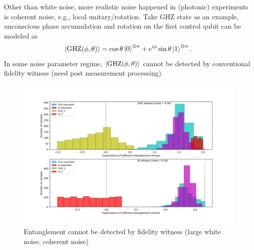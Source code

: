 \documentclass[
reprint,
aps,
pra,
floatfix,
]{revtex4-2}
\theoremstyle{plain}
\theoremstyle{definition}
\newcommand{\ghz}{\text{GHZ}}
\begin{document}
Other than white noise, more realistic noise happened in (photonic) experiments is coherent noise, e.g., local unitary/rotation.
Take GHZ state as an example, unconscious phase accumulation and 
rotation on the first control qubit can be modeled as \cite{zhouEntanglementDetectionCoherent2020}
\begin{equation}
	\ket{\ghz(\phi,\theta)}=
	\cos\theta\ket{0}^{\otimes n}+e^{\ii \phi}\sin\theta\ket{1}^{\otimes n}.
	\label{eq:coherent_noise}
\end{equation}
In some noise parameter regime, $\ket{\ghz(\phi,\theta)}$ cannot be detected by conventional fidelity witness (need post measurement processing).
\begin{figure}[!ht]
	\centering
	\includegraphics[width=.9\linewidth]{./Code/fidelity_witness_compare_2_long.png}
	\caption{Entanglement cannot be detected by fidelity witness (large white noise, coherent noise)}
\end{figure}
\end{document}

